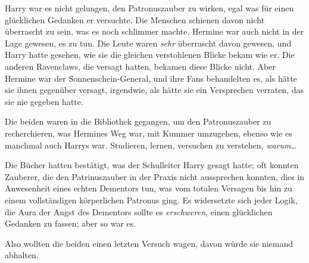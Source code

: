 Harry war es nicht gelungen, den Patronuszauber zu wirken, egal was für einen glücklichen Gedanken er versuchte. Die Menschen schienen davon nicht überrascht zu sein, was es noch schlimmer machte. Hermine war auch nicht in der Lage gewesen, es zu tun. Die Leute waren \emph{sehr} überrascht davon gewesen, und Harry hatte gesehen, wie sie die gleichen verstohlenen Blicke bekam wie er. Die anderen Ravenclaws, die versagt hatten, bekamen diese Blicke nicht. Aber Hermine war der Sonnenschein-General, und ihre Fans behandelten es, als hätte sie ihnen gegenüber versagt, irgendwie, als hätte sie ein Versprechen verraten, das sie nie gegeben hatte.

Die beiden waren in die Bibliothek gegangen, um den Patronuszauber zu recherchieren, was Hermines Weg war, mit Kummer umzugehen, ebenso wie es manchmal auch Harrys war. Studieren, lernen, versuchen zu verstehen, \emph{warum}…

Die Bücher hatten bestätigt, was der Schulleiter Harry gesagt hatte; oft konnten Zauberer, die den Patrinuszauber in der Praxis nicht aussprechen konnten, dies in Anwesenheit eines echten Dementors tun, was vom totalen Versagen bis hin zu einem vollständigen körperlichen Patronus ging. Es widersetzte sich jeder Logik, die Aura der Angst des Dementors sollte es \emph{erschweren}, einen glücklichen Gedanken zu fassen; aber so war es.

Also wollten die beiden einen letzten Versuch wagen, davon würde sie niemand abhalten.

